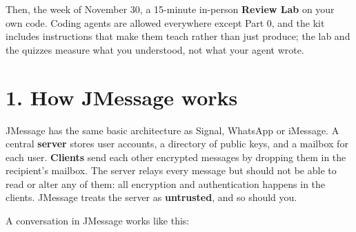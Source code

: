 \documentclass[11pt]{article}
\begin{document}
Then, the week of November 30, a 15-minute in-person \textbf{Review Lab} on your own code. Coding agents are allowed everywhere except Part 0, and the kit includes instructions that make them teach rather than just produce; the lab and the quizzes measure what you understood, not what your agent wrote.

\section*{1. How JMessage works}

JMessage has the same basic architecture as Signal, WhatsApp or iMessage. A central \textbf{server} stores user accounts, a directory of public keys, and a mailbox for each user. \textbf{Clients} send each other encrypted messages by dropping them in the recipient's mailbox. The server relays every message but should not be able to read or alter any of them: all encryption and authentication happens in the clients. JMessage treats the server as \textbf{untrusted}, and so should you.

A conversation in JMessage works like this:
\end{document}
